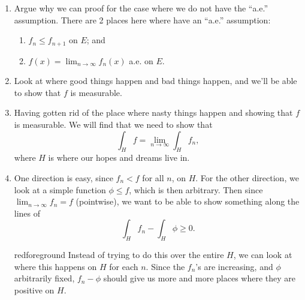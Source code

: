 \documentclass[notoc,notitlepage]{tufte-book}
\begin{document}
\begin{strategy}
  \begin{enumerate}
    \item Argue why we can proof for the case where we do not have the ``a.e.''
      assumption. There are 2 places here where have an ``a.e.'' assumption:
      \begin{enumerate}
        \item $f_n \leq f_{n+1}$ on $E$; and
        \item $f(x) = \lim_{n \to \infty} f_n(x)$ a.e. on $E$.
      \end{enumerate}
    \item Look at where good things happen and bad things happen, and we'll be
      able to show that $f$ is measurable.
    \item Having gotten rid of the place where nasty things happen and showing
      that $f$ is measurable. We will find that we need to show that
      \begin{equation*}
        \int_{H} f = \lim_{n \to \infty} \int_{H} f_n,
      \end{equation*}
      where $H$ is where our hopes and dreams live in.
    \item One direction is easy, since $f_n < f$ for all $n$, on $H$. For the
      other direction, we look at a simple function $\phi \leq f$, which is then
      arbitrary. Then since $\lim_{n \to \infty} f_n = f$ (pointwise), we want
      to be able to show something along the lines of
      \begin{equation*}
        \int_{H} f_n - \int_{H} \phi \geq 0.
      \end{equation*}
      \begin{quotebox}{red}{foreground}
        Instead of trying to do this over the entire $H$, we can look at where
        this happens on $H$ for each $n$. Since the $f_n$'s are increasing, and
        $\phi$ arbitrarily fixed, $f_n - \phi$ should give us more and more
        places where they are positive on $H$.
      \end{quotebox}
  \end{enumerate}
\end{strategy}
\end{document}
